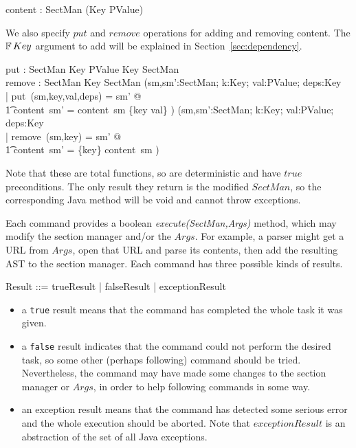 \documentclass{llncs} %
\begin{document}
\begin{axdef}
  content : SectMan \fun (Key \ffun PValue)
\end{axdef}

We also specify $put$ and $remove$ operations for adding and removing
content.  The $\finset Key$ argument to add will be explained in
Section~\ref{sec:dependency}.
\begin{axdef}
  put : SectMan \cross Key \cross PValue \cross \finset Key \fun SectMan\\
  remove : SectMan \cross Key \fun SectMan
\where
  (\forall sm,sm':SectMan; k:Key; val:PValue; deps:\finset Key \\
  | put~(sm,key,val,deps) = sm' @ \\
  \t1 content~sm' = content~sm \oplus \{key \mapsto val\} ) 
\also
  (\forall sm,sm':SectMan; k:Key; val:PValue; deps:\finset Key \\
  | remove~(sm,key) = sm' @ \\
  \t1 content~sm' = \{key\} \ndres content~sm ) \\
\end{axdef}
Note that these are total functions, so are deterministic and
have $true$ preconditions.  The only result they return is the
modified $SectMan$, so the corresponding Java method will be void
and cannot throw exceptions.

Each command provides a boolean \emph{execute(SectMan,Args)} method,
which may modify the section manager and/or the $Args$.
For example, a parser might get a URL from $Args$,
open that URL and parse its contents, then add 
the resulting AST to the section manager.  Each command
has three possible kinds of results.
\begin{zed}
  Result ::= trueResult | falseResult | exceptionResult
\end{zed}
\begin{itemize}
\item a \texttt{true} result means that the command has
  completed the whole task it was given.
\item a \texttt{false} result indicates that the command
  could not perform the desired task, so some other (perhaps following)
  command should be tried.  Nevertheless, the command may have
  made some changes to the section manager or $Args$, in order
  to help following commands in some way.
\item an exception result means that the command has detected
  some serious error and the whole execution should be aborted.
  Note that $exceptionResult$ is an abstraction of the set of all Java
  exceptions.
\end{itemize}
\end{document}
